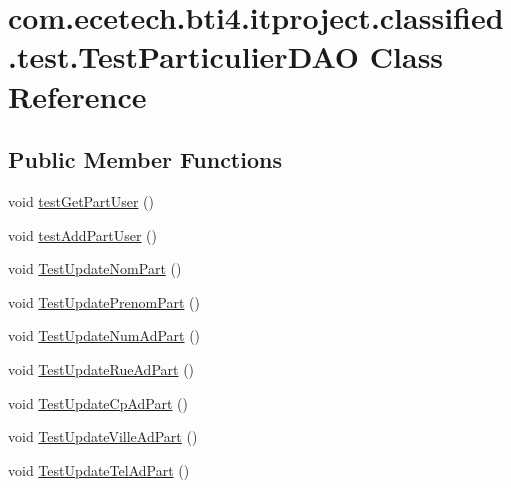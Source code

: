 \hypertarget{classcom_1_1ecetech_1_1bti4_1_1itproject_1_1classified_1_1test_1_1_test_particulier_d_a_o}{}\section{com.\+ecetech.\+bti4.\+itproject.\+classified.\+test.\+Test\+Particulier\+D\+AO Class Reference}
\label{classcom_1_1ecetech_1_1bti4_1_1itproject_1_1classified_1_1test_1_1_test_particulier_d_a_o}
\subsection*{Public Member Functions}
\begin{DoxyCompactItemize}
\item 
void \hyperlink{classcom_1_1ecetech_1_1bti4_1_1itproject_1_1classified_1_1test_1_1_test_particulier_d_a_o_a68b502f8931c9fe9394553c24c9570cc}{test\+Get\+Part\+User} ()
\item 
void \hyperlink{classcom_1_1ecetech_1_1bti4_1_1itproject_1_1classified_1_1test_1_1_test_particulier_d_a_o_a8f9d5081f46f2acae510c1d9c89a02df}{test\+Add\+Part\+User} ()
\item 
void \hyperlink{classcom_1_1ecetech_1_1bti4_1_1itproject_1_1classified_1_1test_1_1_test_particulier_d_a_o_a77943cfb92c08decd46d447fff4ba0f2}{Test\+Update\+Nom\+Part} ()
\item 
void \hyperlink{classcom_1_1ecetech_1_1bti4_1_1itproject_1_1classified_1_1test_1_1_test_particulier_d_a_o_a52d350279dff61f23a5316645bed6973}{Test\+Update\+Prenom\+Part} ()
\item 
void \hyperlink{classcom_1_1ecetech_1_1bti4_1_1itproject_1_1classified_1_1test_1_1_test_particulier_d_a_o_a733fee6210a4249036e878ea10b20767}{Test\+Update\+Num\+Ad\+Part} ()
\item 
void \hyperlink{classcom_1_1ecetech_1_1bti4_1_1itproject_1_1classified_1_1test_1_1_test_particulier_d_a_o_a20eedf52c6ab51b9dc67b32277db428a}{Test\+Update\+Rue\+Ad\+Part} ()
\item 
void \hyperlink{classcom_1_1ecetech_1_1bti4_1_1itproject_1_1classified_1_1test_1_1_test_particulier_d_a_o_a542c88b0cd23771c792c3f518b6919b8}{Test\+Update\+Cp\+Ad\+Part} ()
\item 
void \hyperlink{classcom_1_1ecetech_1_1bti4_1_1itproject_1_1classified_1_1test_1_1_test_particulier_d_a_o_a4036a8b0e36e83ae5d8a63760f528b86}{Test\+Update\+Ville\+Ad\+Part} ()
\item 
void \hyperlink{classcom_1_1ecetech_1_1bti4_1_1itproject_1_1classified_1_1test_1_1_test_particulier_d_a_o_a7597e5169f1f0288f5d8ca1605c0caed}{Test\+Update\+Tel\+Ad\+Part} ()
\end{DoxyCompactItemize}


